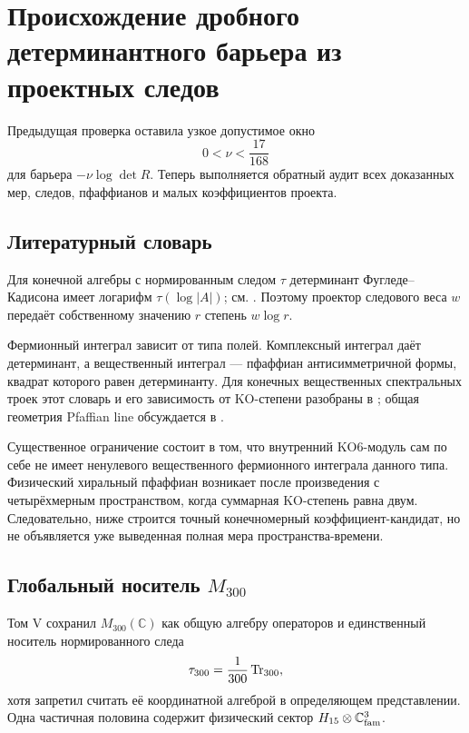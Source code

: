 \chapter{Происхождение дробного детерминантного барьера из проектных следов}

Предыдущая проверка оставила узкое допустимое окно
\begin{equation}
 0<\nu<\frac{17}{168}
 \label{eq:v6-fractional-window-recall}
\end{equation}
для барьера $-\nu\log\det R$. Теперь выполняется обратный аудит всех
доказанных мер, следов, пфаффианов и малых коэффициентов проекта.

\section{Литературный словарь}

Для конечной алгебры с нормированным следом $\tau$ детерминант
Фугледе--Кадисона имеет логарифм $\tau(\log|A|)$; см.
. Поэтому проектор следового веса $w$ передаёт
собственному значению $r$ степень $w\log r$.

Фермионный интеграл зависит от типа полей. Комплексный интеграл даёт
детерминант, а вещественный интеграл --- пфаффиан антисимметричной формы,
квадрат которого равен детерминанту. Для конечных вещественных спектральных
троек этот словарь и его зависимость от KO-степени разобраны в
; общая геометрия Pfaffian line обсуждается в
.

Существенное ограничение состоит в том, что внутренний KO6-модуль сам по
себе не имеет ненулевого вещественного фермионного интеграла данного типа.
Физический хиральный пфаффиан возникает после произведения с
четырёхмерным пространством, когда суммарная KO-степень равна двум.
Следовательно, ниже строится точный конечномерный коэффициент-кандидат, но
не объявляется уже выведенная полная мера пространства-времени.

\section{Глобальный носитель \texorpdfstring{$M_{300}$}{M300}}

Том V сохранил $M_{300}(\mathbb C)$ как общую алгебру операторов и
единственный носитель нормированного следа
\begin{equation}
 \tau_{300}=\frac1{300}\operatorname{Tr}_{300},
\end{equation}
хотя запретил считать её координатной алгеброй в определяющем
представлении. Одна частичная половина содержит физический сектор
$H_{15}\otimes\mathbb C^3_{\rm fam}$.

